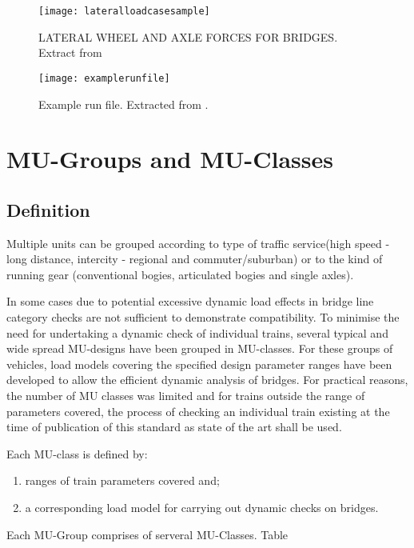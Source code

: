 \begin{appendices}
\begin{figure}[h]
    \centering
    \texttt{[image: lateralloadcasesample]}
    \caption{LATERAL WHEEL AND AXLE FORCES FOR BRIDGES. Extract from \citet[Fig 3.1]{d181}}
    \label{fig:lateralloadcasesample}
\end{figure}

\begin{figure}[h]
    \centering
    \texttt{[image: examplerunfile]}
    \caption{Example run file. Extracted from \citet{d181dt329}.  }
    \label{fig:examplerunfile}
\end{figure}

\chapter{MU-Groups and MU-Classes}\label{app:mu}

\section{Definition}
Multiple units can be grouped according to type of traffic service(high speed - long distance, intercity - regional and commuter/suburban) or to the kind of running gear (conventional bogies, articulated bogies and single axles).


In some cases due to potential excessive dynamic load effects in bridge line category checks are not sufficient to demonstrate compatibility. To minimise the need for undertaking a dynamic check of individual trains, several typical and wide spread MU-designs have been grouped in MU-classes. For these groups of vehicles, load models covering the specified design parameter ranges have been developed to allow the efficient dynamic analysis of bridges. For practical reasons, the number of MU classes was limited and for trains outside the range of parameters covered, the process of checking an individual train existing at the time of publication of this standard as state of the art shall be used.

Each MU-class is defined by:

\begin{enumerate}[-]
\item ranges of train parameters covered and;
\item a corresponding load model for carrying out dynamic checks on bridges.
\end{enumerate}

Each MU-Group comprises of serveral MU-Classes. Table


\end{appendices}
